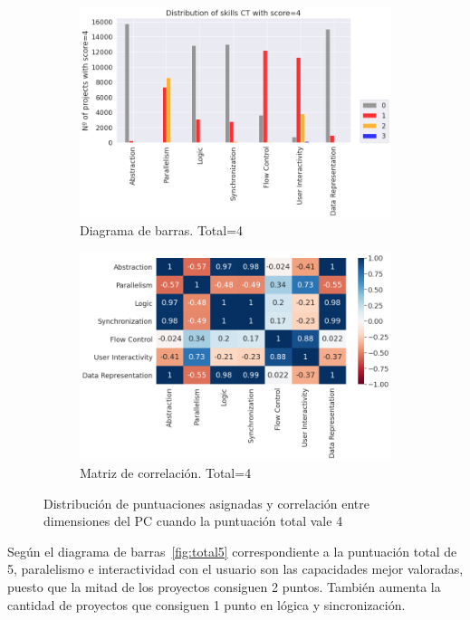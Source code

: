 \documentclass[a4paper, 12pt]{book}
\begin{document}
\begin{figure}[H]
    \centering
    \begin{subfigure}[h]{.49\textwidth} 
        \includegraphics[width=\textwidth]{img/distribucion_4_Scratch}
        \caption{Diagrama de barras. Total=4}
        \label{fig:total4}
    \end{subfigure}       
    \begin{subfigure}[h]{.49\textwidth} 
        \includegraphics[width=\textwidth]{img/corr_4_Scratch}
        \caption{Matriz de correlación. Total=4}
        \label{fig:corr4}
    \end{subfigure}
     \caption{Distribución de puntuaciones asignadas y correlación entre dimensiones del PC cuando la puntuación total vale 4}
\end{figure}


Según el diagrama de barras~\ref{fig:total5} correspondiente a la puntuación total de 5, paralelismo e interactividad con el usuario son las capacidades mejor valoradas, puesto que la mitad de los proyectos consiguen 2 puntos. También aumenta la cantidad de proyectos que consiguen 1 punto en lógica y sincronización.
\end{document}
